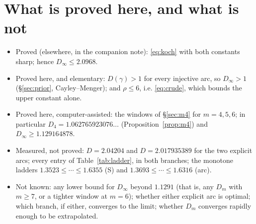 \documentclass[11pt]{article}
\theoremstyle{remark}
\begin{document}
\section*{What is proved here, and what is not}

\begin{itemize}
\item Proved (elsewhere, in the companion note): \eqref{eq:koch} with both constants sharp; hence
  $D_\infty\le2.0968$.
\item Proved here, and elementary: $D(\gamma)>1$ for every injective arc, so $D_\infty>1$
  (\S\ref{sec:prior}, Cayley--Menger); and $\rho\le6$, i.e. \eqref{eq:crude}, which bounds the upper
  constant alone.
\item Proved here, computer-assisted: the windows of \S\ref{sec:m4} for $m=4,5,6$; in particular
  $D_4=1.062765923076\ldots$ (Proposition~\ref{prop:m4}) and $D_\infty\ge1.129164878$.
\item Measured, not proved: $D=2.04204$ and $D=2.017935389$ for the two explicit arcs; every entry
  of Table~\ref{tab:ladder}, in both branches; the monotone ladders
  $1.3523\le\cdots\le1.6355$ (S) and $1.3693\le\cdots\le1.6316$ (arc).
\item Not known: any lower bound for $D_\infty$ beyond $1.1291$ (that is, any $D_m$ with $m\ge7$,
  or a tighter window at $m=6$);
  whether either explicit arc is optimal; which
  branch, if either, converges to the limit; whether $D_m$ converges rapidly enough to be
  extrapolated.
\end{itemize}

\appendix
\end{document}
